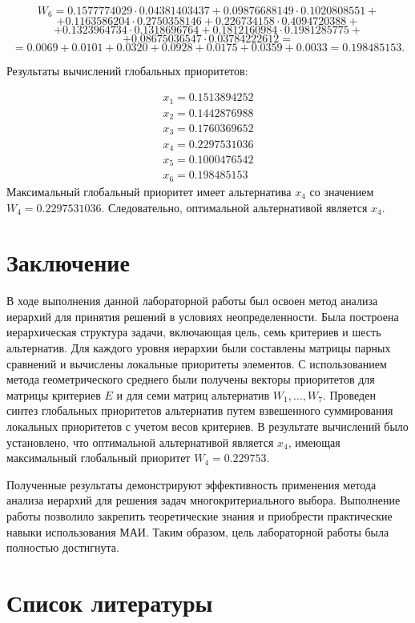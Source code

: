 \[
W_6 = 0.1577774029 \cdot 0.04381403437 + 0.09876688149 \cdot 0.1020808551 +
\]
\[
+ 0.1163586204 \cdot 0.2750358146 + 0.226734158 \cdot 0.4094720388 +
\]
\[
+ 0.1323964734 \cdot 0.1318696764 + 0.1812160984 \cdot 0.1981285775 +
\]
\[
+ 0.08675036547 \cdot 0.03784222612 =
\]
\[
= 0.0069 + 0.0101 + 0.0320 + 0.0928 + 0.0175 + 0.0359 + 0.0033 = 0.198485153.
\]

Результаты вычислений глобальных приоритетов:

\[
\begin{gathered}
x_1 = 0.1513894252 \\
x_2 = 0.1442876988 \\
x_3 = 0.1760369652 \\
x_4 = \mathbf{0.2297531036} \\
x_5 = 0.1000476542 \\
x_6 = 0.198485153
\end{gathered}
\]
Максимальный глобальный приоритет имеет альтернатива $x_4$ со значением $W_4 = 0.2297531036$. Следовательно, оптимальной альтернативой является $x_4$.


\clearpage
\section{Заключение}

В ходе выполнения данной лабораторной работы был освоен метод анализа иерархий для принятия решений в условиях неопределенности. Была построена иерархическая структура задачи, включающая цель, семь критериев и шесть альтернатив. Для каждого уровня иерархии были составлены матрицы парных сравнений и вычислены локальные приоритеты элементов. С использованием метода геометрического среднего были получены векторы приоритетов для матрицы критериев $E$ и для семи матриц альтернатив $W_1, \ldots, W_7$. Проведен синтез глобальных приоритетов альтернатив путем взвешенного суммирования локальных приоритетов с учетом весов критериев. В результате вычислений было установлено, что оптимальной альтернативой является $x_4$, имеющая максимальный глобальный приоритет $W_4 = 0.229753$.

Полученные результаты демонстрируют эффективность применения метода анализа иерархий для решения задач многокритериального выбора. Выполнение работы позволило закрепить теоретические знания и приобрести практические навыки использования МАИ. Таким образом, цель лабораторной работы была полностью достигнута.

\clearpage
\section{Список литературы}

